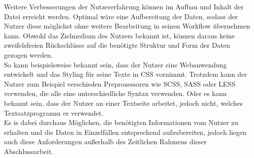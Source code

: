 
Weitere Verbesserungen der Nutzererfahrung können im Aufbau und Inhalt der Datei erreicht werden. Optimal wäre eine Aufbereitung der Daten, sodass der Nutzer diese möglichst ohne weitere Bearbeitung in seinen Workflow übernehmen kann. Obwohl das Zielmedium des Nutzers bekannt ist, können daraus keine zweifelsfreien Rückschlüsse auf die benötigte Struktur und Form der Daten gezogen werden. \\
So kann beispielsweise bekannt sein, dass der Nutzer eine Webanwendung entwickelt und das Styling für seine Texte in CSS vornimmt. Trotzdem kann der Nutzer zum Beispiel verschieden Preprozessoren wie SCSS, SASS oder LESS verwenden, die alle eine unterschiedliche Syntax verwenden.
Oder es kann bekannt sein, dass der Nutzer an einer Textseite arbeitet, jedoch nicht, welches Textsatzprogramm er verwendet\footnotemark{}.\\
Es is dabei durchaus Möglichen, die benötigten Informationen vom Nutzer zu erhalten und die Daten in Einzelfällen entsprechend aufzubereiten, jedoch liegen auch diese Anforderungen außerhalb des Zeitlichen Rahmens dieser Abschlussarbeit.
